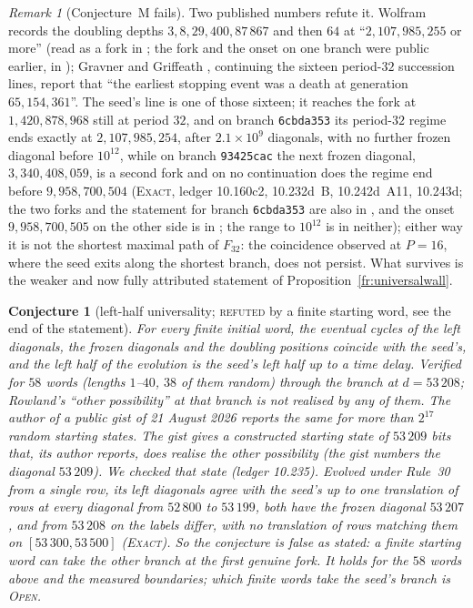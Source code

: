 \documentclass[11pt]{article}
\newtheorem{conjecture}[theorem]{Conjecture}
\theoremstyle{definition}
\theoremstyle{remark}
\newtheorem{remark}[theorem]{Remark}
\newcommand{\EXACT}{\textsc{Exact}}
\newcommand{\OPEN}{\textsc{Open}}
\begin{document}
\begin{remark}[Conjecture~M fails]\label{fr:conjM:refuted}
Two published numbers refute it. Wolfram \cite[p.~871]{NKS} records the doubling depths
$3,8,29,400,87\,867$ and then $64$ at ``$2{,}107{,}985{,}255$ or more'' (read as a fork in \cite{WN}; the fork and the onset on one branch were public earlier, in \cite{Dib,Pat}); Gravner and Griffeath
\cite[\S8]{GG}, continuing the sixteen period-$32$ succession lines, report that ``the earliest stopping
event was a death at generation $65{,}154{,}361$''. The seed's line is one of those sixteen; it reaches the fork at $1{,}420{,}878{,}968$ still at period $32$,
and on branch \texttt{6cbda353} its period-$32$ regime ends exactly at $2{,}107{,}985{,}254$, after $2.1\times10^{9}$
diagonals, with no further frozen diagonal before $10^{12}$, while on branch \texttt{93425cac} the next frozen diagonal, $3{,}340{,}408{,}059$, is a second fork and on no continuation does the regime end before
$9{,}958{,}700{,}504$ (\EXACT, ledger 10.160c2, 10.232d~B, 10.242d~A11, 10.243d; the two forks and the statement for branch \texttt{6cbda353} are also in \cite{Dib,Pat}, and the onset $9{,}958{,}700{,}505$ on the other side is in \cite{Pat}; the range to $10^{12}$ is in neither); either way it is not the shortest maximal path of $F_{32}$: the coincidence
observed at $P=16$, where the seed exits along the shortest branch, does not persist. What survives is
the weaker and now fully attributed statement of Proposition~\ref{fr:universalwall}.
\end{remark}


\begin{conjecture}[left-half universality; \textsc{refuted} by a finite starting word, see the end of the statement]\label{fr:universal}
For every finite initial word, the eventual cycles of the left diagonals, the frozen diagonals and the doubling positions coincide with the seed's, and the left half of the evolution is the seed's left half up to a time delay. Verified for $58$ words (lengths $1$--$40$, $38$ of them random) through the branch at $d=53\,208$; Rowland's ``other possibility'' at that branch is not realised by any of them. The author of a public gist of 21 August 2026 \cite{Lania} reports the same for more than $2^{17}$ random starting states. The gist gives a constructed starting state of $53\,209$ bits that, its author reports, does realise the other possibility (the gist numbers the diagonal $53\,209$). We checked that state (ledger 10.235). Evolved under Rule~30 from a single row, its left diagonals agree with the seed's up to one translation of rows at every diagonal from $52\,800$ to $53\,199$, both have the frozen diagonal $53\,207$, and from $53\,208$ on the labels differ, with no translation of rows matching them on $[53\,300,53\,500]$ (\EXACT). So the conjecture is false as stated: a finite starting word can take the other branch at the first genuine fork. It holds for the $58$ words above and the measured boundaries; which finite words take the seed's branch is \OPEN.
\end{conjecture}
\end{document}
